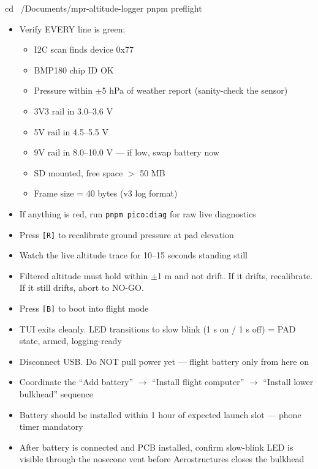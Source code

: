 \documentclass[11pt,a4paper,oneside]{report}
\begin{document}
\begin{codebox}
cd ~/Documents/mpr-altitude-logger
pnpm preflight
\end{codebox}

\begin{itemize}
  \item Verify EVERY line is green:
  \begin{itemize}
    \item I2C scan finds device 0x77
    \item BMP180 chip ID OK
    \item Pressure within $\pm$5 hPa of weather report (sanity-check the sensor)
    \item 3V3 rail in 3.0--3.6 V
    \item 5V rail in 4.5--5.5 V
    \item 9V rail in 8.0--10.0 V --- if low, swap battery now
    \item SD mounted, free space $>$ 50 MB
    \item Frame size = 40 bytes (v3 log format)
  \end{itemize}
  \item If anything is red, run \texttt{pnpm pico:diag} for raw live diagnostics
\end{itemize}

\begin{itemize}
  \item Press \texttt{[R]} to recalibrate ground pressure at pad elevation
  \item Watch the live altitude trace for 10--15 seconds standing still
  \item Filtered altitude must hold within $\pm$1 m and not drift. If it drifts, recalibrate. If it still drifts, abort to NO-GO.
  \item Press \texttt{[B]} to boot into flight mode
  \item TUI exits cleanly. LED transitions to slow blink (1 s on / 1 s off) = PAD state, armed, logging-ready
  \item Disconnect USB. Do NOT pull power yet --- flight battery only from here on
\end{itemize}

\begin{itemize}
  \item Coordinate the ``Add battery'' $\to$ ``Install flight computer'' $\to$ ``Install lower bulkhead'' sequence
  \item Battery should be installed within 1 hour of expected launch slot --- phone timer mandatory
  \item After battery is connected and PCB installed, confirm slow-blink LED is visible through the nosecone vent before Aerostructures closes the bulkhead
\end{itemize}
\end{document}
